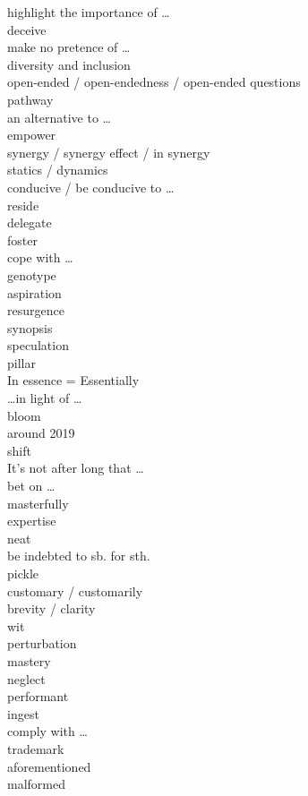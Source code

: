 \documentclass[12pt]{article}
\begin{document}
highlight the importance of \dots \\
deceive \\
make no pretence of \dots \\
diversity and inclusion \\
open-ended / open-endedness / open-ended questions \\
pathway \\
an alternative to \dots \\
empower \\
synergy / synergy effect / in synergy \\
statics / dynamics \\
conducive / be conducive to \dots \\
reside \\
delegate \\
foster \\
cope with \dots \\
genotype \\
aspiration \\
resurgence \\
synopsis \\
speculation \\
pillar \\
In essence = Essentially \\
\dots in light of \dots \\
bloom \\
around 2019 \\
shift \\
It's not after long that \dots \\
bet on \dots \\
masterfully \\
expertise \\
neat \\
be indebted to sb. for sth. \\
pickle \\
customary / customarily \\
brevity / clarity \\
wit \\
perturbation \\ 
mastery \\
neglect \\ 
performant \\ 
ingest \\ 
comply with \dots \\ 
trademark \\ 
aforementioned \\ 
malformed \\ 
\end{document}
